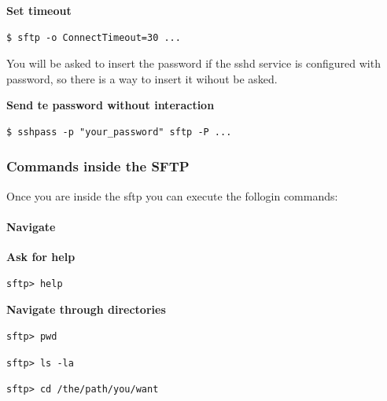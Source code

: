 \documentclass{article}
\newenvironment{codetemplate}[1][]{%
  \mybasecolorbox[#1]
  \itshape
}{%
  \endmybasecolorbox
}
\begin{document}
\textbf{Set timeout}
\begin{codetemplate}{}
\begin{verbatim}
$ sftp -o ConnectTimeout=30 ...
\end{verbatim}
\end{codetemplate}

You will be asked to insert the password if the sshd service is configured with password, so there is a way to insert it wihout be asked.

\textbf{Send te password without interaction}
\begin{codetemplate}{}
\begin{verbatim}
$ sshpass -p "your_password" sftp -P ...
\end{verbatim}
\end{codetemplate}

\subsubsection{Commands inside the SFTP}

Once you are inside the sftp you can execute the follogin commands:

\paragraph{Navigate}

\textbf{Ask for help}
\begin{codetemplate}{}
\begin{verbatim}
sftp> help
\end{verbatim}
\end{codetemplate}

\textbf{Navigate through directories}
\begin{codetemplate}{}
\begin{verbatim}
sftp> pwd
\end{verbatim}
\end{codetemplate}

\begin{codetemplate}{}
\begin{verbatim}
sftp> ls -la
\end{verbatim}
\end{codetemplate}

\begin{codetemplate}{}
\begin{verbatim}
sftp> cd /the/path/you/want
\end{verbatim}
\end{codetemplate}
\end{document}
